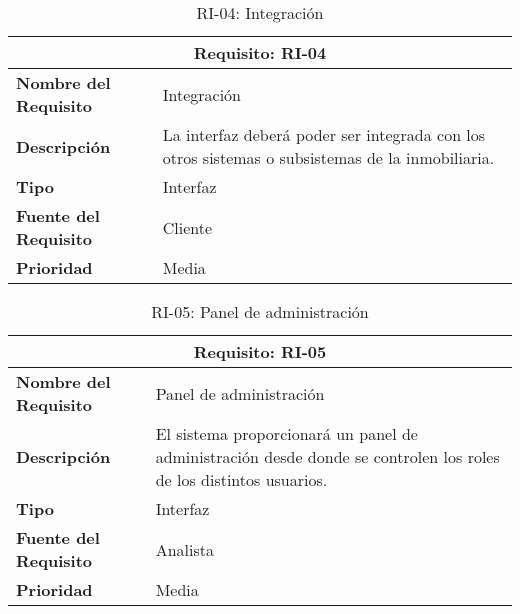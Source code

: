 \begin{table}[H]
\begin{center}
\begin{tabular}{p{} p{7cm}}
\multicolumn{2}{c}{\textbf{Requisito: RI-04} } \\
\hline \hline
\textbf{Nombre del Requisito} & Integración  \\
\hline
\textbf{Descripción} & La interfaz deberá poder ser integrada con los otros sistemas o subsistemas de la inmobiliaria.  \\
\hline
\textbf{Tipo} & Interfaz \\
\hline
\textbf{Fuente del Requisito} & Cliente  \\
\hline
\textbf{Prioridad} & Media  \\ \hline
\end{tabular}
\caption{RI-04: Integración}
\label{tab:RI-04}
\end{center}
\end{table}

\begin{table}[H]
\begin{center}
\begin{tabular}{p{} p{7cm}}
\multicolumn{2}{c}{\textbf{Requisito: RI-05} } \\
\hline \hline
\textbf{Nombre del Requisito} & Panel de administración  \\
\hline
\textbf{Descripción} & El sistema proporcionará un panel de administración desde donde se controlen los roles de los distintos usuarios.  \\
\hline
\textbf{Tipo} & Interfaz \\
\hline
\textbf{Fuente del Requisito} & Analista  \\
\hline
\textbf{Prioridad} & Media  \\ \hline
\end{tabular}
\caption{RI-05: Panel de administración}
\label{tab:RI-05}
\end{center}
\end{table}
